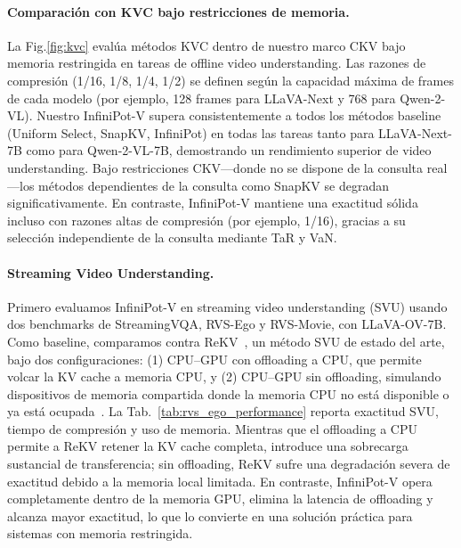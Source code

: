 \paragraph{Comparación con KVC bajo restricciones de memoria.}
La Fig.\ref{fig:kvc} evalúa métodos KVC dentro de nuestro marco CKV bajo memoria restringida en tareas de offline video understanding. Las razones de compresión (1/16, 1/8, 1/4, 1/2) se definen según la capacidad máxima de frames de cada modelo (por ejemplo, 128 frames para LLaVA-Next y 768 para Qwen-2-VL). Nuestro InfiniPot-V supera consistentemente a todos los métodos baseline (Uniform Select, SnapKV, InfiniPot) en todas las tareas tanto para LLaVA-Next-7B como para Qwen-2-VL-7B, demostrando un rendimiento superior de video understanding. Bajo restricciones CKV---donde no se dispone de la consulta real---los métodos dependientes de la consulta como SnapKV\cite{li2024snapkv} se degradan significativamente. En contraste, InfiniPot-V mantiene una exactitud sólida incluso con razones altas de compresión (por ejemplo, 1/16), gracias a su selección independiente de la consulta mediante TaR y VaN.




\paragraph{Streaming Video Understanding.}
Primero evaluamos InfiniPot-V en streaming video understanding (SVU) usando dos benchmarks de StreamingVQA, RVS-Ego y RVS-Movie, con LLaVA-OV-7B.
Como baseline, comparamos contra ReKV~\cite{Shangzhe2025streaming}, un método SVU de estado del arte, bajo dos configuraciones: 
(1) CPU--GPU con offloading a CPU, que permite volcar la KV cache a memoria CPU, y 
(2) CPU--GPU sin offloading, simulando dispositivos de memoria compartida donde la memoria CPU no está disponible o ya está ocupada~\cite{Karumbunathan2022JetsonAGXOrin}. 
La Tab.~\ref{tab:rvs_ego_performance} reporta exactitud SVU, tiempo de compresión y uso de memoria. 
Mientras que el offloading a CPU permite a ReKV retener la KV cache completa, introduce una sobrecarga sustancial de transferencia; sin offloading, ReKV sufre una degradación severa de exactitud debido a la memoria local limitada. 
En contraste, InfiniPot-V opera completamente dentro de la memoria GPU, elimina la latencia de offloading y alcanza mayor exactitud, lo que lo convierte en una solución práctica para sistemas con memoria restringida.

